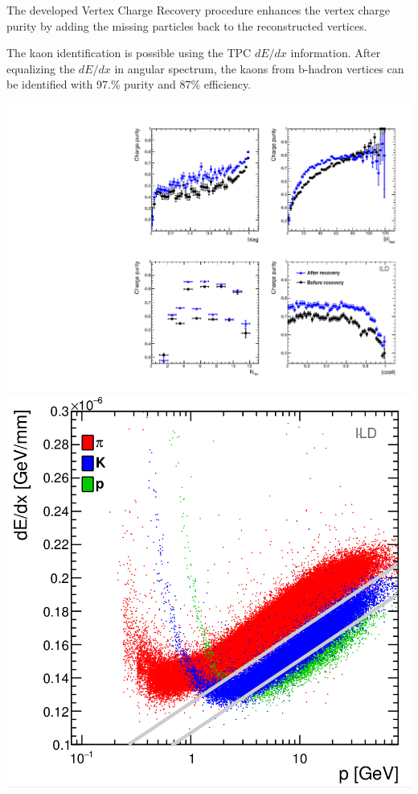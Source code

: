 \color{DarkSlateGray}
The developed Vertex Charge Recovery procedure enhances the vertex charge purity by adding the missing particles back to the reconstructed vertices. 


The kaon identification is possible using the TPC $dE/dx$ information. After equalizing the $dE/dx$ in angular spectrum, the kaons from b-hadron vertices can be identified with 97.\% purity and 87\% efficiency.
\begin{center}\vspace{0.5cm}
	
	\includegraphics[clip, trim=10cm 0cm 0cm 10cm,width=0.45\linewidth]{plots/purity-recovery-ild.pdf}\label{fig:Charges_a_3}
	\includegraphics[width=0.41\linewidth]{plots/dedx2.png}\label{fig:Charges_b_3}
	\label{fig:Charges_3}
\end{center}\vspace{1cm}



